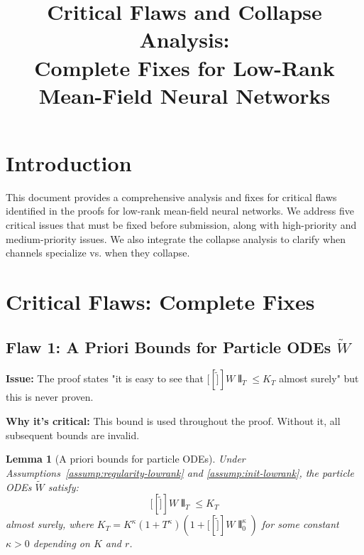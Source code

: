 \documentclass[11pt]{article}
\title{Critical Flaws and Collapse Analysis:\\Complete Fixes for Low-Rank Mean-Field Neural Networks}
\author{}
\date{}
\newcommand{\1}{\mathbbm{1}}
\newcommand{\llbracket}{[\![}
\newcommand{\rrbracket}{]\!]}
\newcommand{\interleave}[1]{\llbracket #1 \rrbracket}
\newtheorem{lemma}{Lemma}
\begin{document}
\maketitle
\tableofcontents

\section{Introduction}

This document provides a comprehensive analysis and fixes for critical flaws identified in the proofs for low-rank mean-field neural networks. We address five critical issues that must be fixed before submission, along with high-priority and medium-priority issues. We also integrate the collapse analysis to clarify when channels specialize vs. when they collapse.

\section{Critical Flaws: Complete Fixes}

\subsection{Flaw 1: A Priori Bounds for Particle ODEs $\tilde{W}$}

\textbf{Issue:} The proof states "it is easy to see that $\interleave\tilde{W}\interleave_T \le K_T$ almost surely" but this is never proven.

\textbf{Why it's critical:} This bound is used throughout the proof. Without it, all subsequent bounds are invalid.

\begin{lemma}[A priori bounds for particle ODEs]
\label{lem:particle-a-priori}
Under Assumptions~\ref{assump:regularity-lowrank} and \ref{assump:init-lowrank}, the particle ODEs $\tilde{W}$ satisfy:
\[
\interleave\tilde{W}\interleave_T \le K_T
\]
almost surely, where $K_T = K^{\kappa}(1+T^{\kappa})(1+\interleave\tilde{W}\interleave_0^{\kappa})$ for some constant $\kappa>0$ depending on $K$ and $r$.
\end{lemma}
\end{document}
